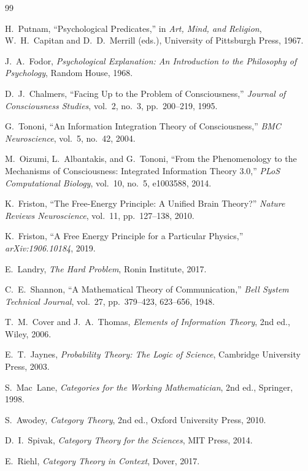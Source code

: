 \documentclass[12pt, a4paper]{article}
\theoremstyle{plain}
\theoremstyle{definition}
\theoremstyle{remark}
\begin{document}
\begin{thebibliography}{99}

H.~Putnam,
``Psychological Predicates,''
in \emph{Art, Mind, and Religion}, W.~H.~Capitan and D.~D.~Merrill (eds.),
University of Pittsburgh Press, 1967.

J.~A.~Fodor,
\emph{Psychological Explanation: An Introduction to the Philosophy of Psychology},
Random House, 1968.

D.~J.~Chalmers,
``Facing Up to the Problem of Consciousness,''
\emph{Journal of Consciousness Studies}, vol.~2, no.~3, pp.~200--219, 1995.

G.~Tononi,
``An Information Integration Theory of Consciousness,''
\emph{BMC Neuroscience}, vol.~5, no.~42, 2004.

M.~Oizumi, L.~Albantakis, and G.~Tononi,
``From the Phenomenology to the Mechanisms of Consciousness: Integrated Information Theory 3.0,''
\emph{PLoS Computational Biology}, vol.~10, no.~5, e1003588, 2014.

K.~Friston,
``The Free-Energy Principle: A Unified Brain Theory?''
\emph{Nature Reviews Neuroscience}, vol.~11, pp.~127--138, 2010.

K.~Friston,
``A Free Energy Principle for a Particular Physics,''
\emph{arXiv:1906.10184}, 2019.

E.~Landry,
\emph{The Hard Problem},
Ronin Institute, 2017.

C.~E.~Shannon,
``A Mathematical Theory of Communication,''
\emph{Bell System Technical Journal}, vol.~27, pp.~379--423, 623--656, 1948.

T.~M.~Cover and J.~A.~Thomas,
\emph{Elements of Information Theory},
2nd ed., Wiley, 2006.

E.~T.~Jaynes,
\emph{Probability Theory: The Logic of Science},
Cambridge University Press, 2003.

S.~Mac~Lane,
\emph{Categories for the Working Mathematician},
2nd ed., Springer, 1998.

S.~Awodey,
\emph{Category Theory},
2nd ed., Oxford University Press, 2010.

D.~I.~Spivak,
\emph{Category Theory for the Sciences},
MIT Press, 2014.

E.~Riehl,
\emph{Category Theory in Context},
Dover, 2017.


\end{thebibliography}
\end{document}
